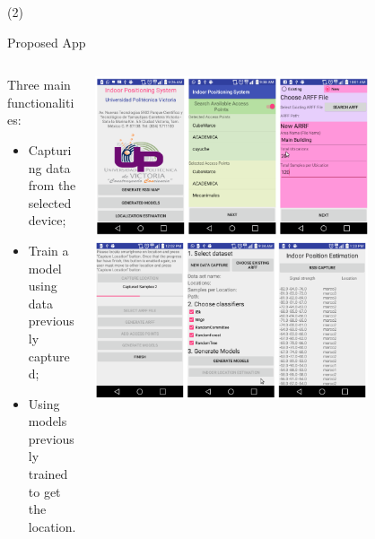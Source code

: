 \begin{frame}{ (2)}
\begin{block}{Proposed App} 

\begin{columns}
\begin{column}{0.55\textwidth}
Three main functionalities:
\begin{itemize}
\item  Capturing data from the selected device; 
\item  Train a model using data previously captured;
\item  Using models previously trained to get the location.
\end{itemize}

\end{column}
\begin{column}{0.45\textwidth}
  \begin{center}
     \includegraphics[width=0.75\textwidth]{Figs/IndoorPositionSystem3}
     \includegraphics[width=0.75\textwidth]{Figs/IndoorPositionSystem4}
     \end{center}
\end{column}
\end{columns}
\end{block} 


\end{frame}
